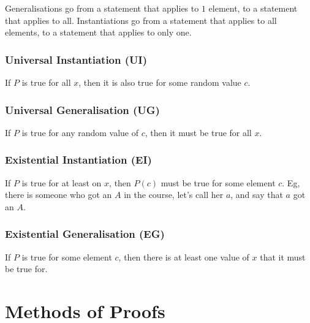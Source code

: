 \begin{note}
    Generalisations go from a statement that applies to \(1\) element, to a statement that applies to all.
    Instantiations go from a statement that applies to all elements, to a statement that applies to only one.
\end{note}

\subsubsection{Universal Instantiation (UI)}\label{ssub:universal_instantiation_ui_}

If \(P\) is true for all \(x\), then it is also true for some random value \(c\).

\subsubsection{Universal Generalisation (UG)}\label{ssub:universal_generalisation_ug_}

If \(P\) is true for any random value of \(c\), then it must be true for all \(x\).

\subsubsection{Existential Instantiation (EI)}\label{ssub:existential_instantiation_ei_}

If \(P\) is true for at least on \(x\), then \(P(c)\) must be true for some element \(c\). Eg, there is someone who got an \(A\) in the course, let's call her \(a\), and say that \(a\) got an \(A\).

\subsubsection{Existential Generalisation (EG)}\label{ssub:existential_generalisation_eg_}

If \(P\) is true for some element \(c\), then there is at least one value of \(x\) that it must be true for.

\section{Methods of Proofs}\label{sec:methods_of_proofs}

